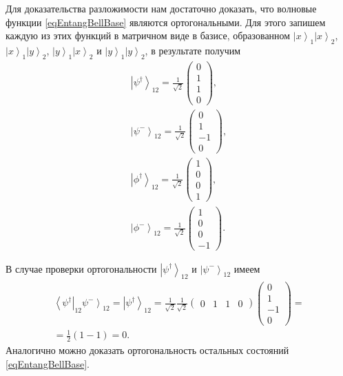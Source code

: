 Для доказательства разложимости нам достаточно доказать, что волновые
функции \eqref{eqEntangBellBase} являются ортогональными. Для этого
запишем каждую из этих функций в матричном виде в базисе, образованном
$\left|x\right>_1\left|x\right>_2$, $\left|x\right>_1\left|y\right>_2$,
$\left|y\right>_1\left|x\right>_2$ и
$\left|y\right>_1\left|y\right>_2$, в результате получим 
\begin{eqnarray}
  \left|\psi^{\dag}\right>_{12} = 
  \frac{1}{\sqrt{2}}
  \left(
  \begin{array}{c}
    0 \\
    1 \\
    1 \\
    0
  \end{array}
  \right),
  \nonumber \\
  \left|\psi^{-}\right>_{12} = 
  \frac{1}{\sqrt{2}}
  \left(
  \begin{array}{c}
    0 \\
    1 \\
    -1 \\
    0
  \end{array}
  \right),
  \nonumber \\
  \left|\phi^{\dag}\right>_{12} = 
  \frac{1}{\sqrt{2}}
  \left(
  \begin{array}{c}
    1 \\
    0 \\
    0 \\
    1
  \end{array}
  \right),
  \nonumber \\
  \left|\phi^{-}\right>_{12} = 
  \frac{1}{\sqrt{2}}
  \left(
  \begin{array}{c}
    1 \\
    0 \\
    0 \\
    -1
  \end{array}
  \right).
  \label{eqEntangBellBaseMatrix}
\end{eqnarray}

В случае проверки ортогональности $\left|\psi^{\dag}\right>_{12}$ и 
$\left|\psi^{-}\right>_{12}$ имеем
\begin{eqnarray}
\left<\psi^{\dag}\right|_{12}\left.\psi^{-}\right>_{12} = 
  \left|\psi^{\dag}\right>_{12} = 
  \frac{1}{\sqrt{2}} \frac{1}{\sqrt{2}}
  \left(
  \begin{array}{cccc}
    0 & 1 & 1 & 0
  \end{array}
  \right)   
  \left(
  \begin{array}{c}
    0 \\
    1 \\
    -1 \\
    0
  \end{array}
  \right) = 
\nonumber \\
=
  \frac{1}{2}\left(1 - 1\right) = 0.
\nonumber 
\end{eqnarray}
Аналогично можно доказать ортогональность остальных состояний
\eqref{eqEntangBellBase}. 

